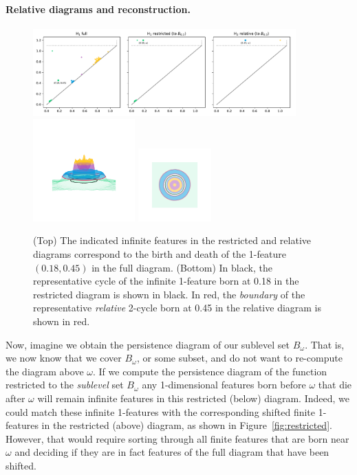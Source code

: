 \paragraph*{Relative diagrams and reconstruction.}

\begin{figure}[htbp]
  \centering
  \includegraphics[width=0.9\textwidth]{figures/relative-dgm-0_0.pdf}
  \includegraphics[trim=500 800 500 800, clip, width=0.35\textwidth]{figures/relative-surf_side-0_0.png}
  \includegraphics[trim=500 500 500 500, clip, width=0.25\textwidth]{figures/relative-surf_top-0_0.png}
  \caption{(Top) The indicated infinite features in the restricted and relative diagrams correspond to the birth and death of the 1-feature $(0.18, 0.45)$ in the full diagram.
  (Bottom) In black, the representative cycle of the infinite 1-feature born at 0.18 in the restricted diagram is shown in black.
  In red, the \emph{boundary} of the representative \emph{relative} 2-cycle born at 0.45 in the relative diagram is shown in red.}\label{fig:relative1}
\end{figure}

Now, imagine we obtain the persistence diagram of our sublevel set $B_\omega$.
That is, we now know that we cover $B_\omega$, or some subset, and do not want to re-compute the diagram above $\omega$.
If we compute the persistence diagram of the function restricted to the \emph{sublevel} set $B_\omega$ any 1-dimensional features born before $\omega$ that die after $\omega$ will remain infinite features in this restricted (below) diagram.
Indeed, we could match these infinite 1-features with the corresponding shifted finite 1-features in the restricted (above) diagram, as shown in Figure~\ref{fig:restricted}.
However, that would require sorting through all finite features that are born near $\omega$ and deciding if they are in fact features of the full diagram that have been shifted.

